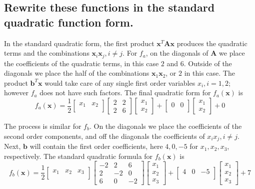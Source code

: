 \documentclass[11pt]{scrartcl}
\newcommand{\vect}{\boldsymbol}
\begin{document}
\subsection{Rewrite these functions in the standard quadratic function form.}
In the standard quadratic form, the first product $\vect{x}^{T}\vect{A}\vect{x}$ produces the quadratic terms and
the combinations $\vect{x}_i\vect{x}_j, i\neq j$.
For $f_a$,
on the diagonals of $\vect{A}$ we place the coefficients of the quadratic terms, in this case $2$ and $6$.
Outside of the diagonals we place the half of the combinations $\vect{x}_1\vect{x}_2$, or $2$ in this case.
The product $\vect{b}^{T}\vect{x}$ would take care of any single first order variables $x_{i}, i=1,2$; however
$f_a$ does not have such factors.
The final quadratic form for $f_a(\vect{x})$ is 
\begin{equation}
	f_a(\vect{x}) = 
	\frac{1}{2}
	\begin{bmatrix}
		x_1 & x_2\\
	\end{bmatrix}
	\begin{bmatrix}
			2 & 2 \\
			2 & 6 
	\end{bmatrix}
	\begin{bmatrix}
			x_1 \\
			x_2
	\end{bmatrix}
	+
	\begin{bmatrix}
		0 & 0\\
	\end{bmatrix}
	\begin{bmatrix}
		x_1\\
		x_2
	\end{bmatrix}
	+ 0
\end{equation}

The process is similar for $f_b$.
On the diagonals we place the coefficients of the second order components, and off the diagonals the 
coefficients of $x_i x_j, i\neq j$.
Next, $\vect{b}$ will contain the first order coefficients, here $4, 0, -5$ for $x_1, x_2, x_3$, respectively.
The standard quadratic formula for $f_b(\vect{x})$ is
\begin{equation}
	f_b(\vect{x}) = 
	\frac{1}{2}
	\begin{bmatrix}
			x_1 & x_2 & x_3\\
	\end{bmatrix}
	\begin{bmatrix}
			-2 & 2 & 6\\
			2 & -2 & 0\\
			6 & 0 & -2
	\end{bmatrix}
	\begin{bmatrix}
		x_1\\
		x_2\\
		x_3
	\end{bmatrix}
	+
	\begin{bmatrix}
		4 & 0 & -5\\
	\end{bmatrix}
	\begin{bmatrix}
			x_1\\
			x_2\\
			x_3
	\end{bmatrix}
	+ 7
\end{equation}
\end{document}
